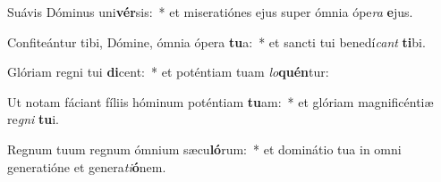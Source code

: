 \item Suávis Dóminus uni\textbf{vér}sis:~* et miseratiónes ejus super ómnia ópe\textit{ra} \textbf{e}jus.
\item Confiteántur tibi, Dómine, ómnia ópera \textbf{tu}a:~* et sancti tui benedí\textit{cant} \textbf{ti}bi.
\item Glóriam regni tui \textbf{di}cent:~* et poténtiam tuam \textit{lo}\textbf{quén}tur:
\item Ut notam fáciant fíliis hóminum poténtiam \textbf{tu}am:~* et glóriam magnificéntiæ re\textit{gni} \textbf{tu}i.
\item Regnum tuum regnum ómnium sæcu\textbf{ló}rum:~* et dominátio tua in omni generatióne et genera\textit{ti}\textbf{ó}nem.
